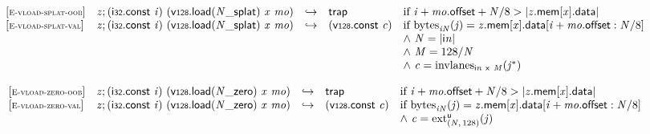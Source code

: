 $$
\begin{array}{@{}l@{}lcl@{}l@{}}
{[\textsc{\scriptsize E{-}vload{-}splat{-}oob}]} \quad & {\mathit{z}} ; (\mathsf{i{\scriptstyle32}}.\mathsf{const}~{\mathit{i}})~({\mathsf{v{\scriptstyle128}.load}}{({{{\mathit{N}}}{\mathsf{\_}}}{\mathsf{splat}})}~{\mathit{x}}~{\mathit{mo}}) &\hookrightarrow& \mathsf{trap} &\quad
  \mbox{if}~{\mathit{i}} + {\mathit{mo}}.\mathsf{offset} + {\mathit{N}} / 8 > {|{{\mathit{z}}.\mathsf{mem}}{{}[{\mathit{x}}]}.\mathsf{data}|} \\
{[\textsc{\scriptsize E{-}vload{-}splat{-}val}]} \quad & {\mathit{z}} ; (\mathsf{i{\scriptstyle32}}.\mathsf{const}~{\mathit{i}})~({\mathsf{v{\scriptstyle128}.load}}{({{{\mathit{N}}}{\mathsf{\_}}}{\mathsf{splat}})}~{\mathit{x}}~{\mathit{mo}}) &\hookrightarrow& (\mathsf{v{\scriptstyle128}}.\mathsf{const}~{\mathit{c}}) &\quad
  \mbox{if}~{{\mathrm{bytes}}}_{{{\mathit{i}}}{{\mathit{N}}}}({\mathit{j}}) = {{\mathit{z}}.\mathsf{mem}}{{}[{\mathit{x}}]}.\mathsf{data}{}[{\mathit{i}} + {\mathit{mo}}.\mathsf{offset} : {\mathit{N}} / 8] \\
 &&&&\quad {\land}~{\mathit{N}} = {|{\mathsf{i}}{{\mathit{n}}}|} \\
 &&&&\quad {\land}~{\mathit{M}} = 128 / {\mathit{N}} \\
 &&&&\quad {\land}~{\mathit{c}} = {{\mathrm{invlanes}}}_{{\mathsf{i}}{{\mathit{n}}}~\mathsf{x}~{\mathit{M}}}({{\mathit{j}}^\ast}) \\
\end{array}
$$

\vspace{1ex}

$$
\begin{array}{@{}l@{}lcl@{}l@{}}
{[\textsc{\scriptsize E{-}vload{-}zero{-}oob}]} \quad & {\mathit{z}} ; (\mathsf{i{\scriptstyle32}}.\mathsf{const}~{\mathit{i}})~({\mathsf{v{\scriptstyle128}.load}}{({{{\mathit{N}}}{\mathsf{\_}}}{\mathsf{zero}})}~{\mathit{x}}~{\mathit{mo}}) &\hookrightarrow& \mathsf{trap} &\quad
  \mbox{if}~{\mathit{i}} + {\mathit{mo}}.\mathsf{offset} + {\mathit{N}} / 8 > {|{{\mathit{z}}.\mathsf{mem}}{{}[{\mathit{x}}]}.\mathsf{data}|} \\
{[\textsc{\scriptsize E{-}vload{-}zero{-}val}]} \quad & {\mathit{z}} ; (\mathsf{i{\scriptstyle32}}.\mathsf{const}~{\mathit{i}})~({\mathsf{v{\scriptstyle128}.load}}{({{{\mathit{N}}}{\mathsf{\_}}}{\mathsf{zero}})}~{\mathit{x}}~{\mathit{mo}}) &\hookrightarrow& (\mathsf{v{\scriptstyle128}}.\mathsf{const}~{\mathit{c}}) &\quad
  \mbox{if}~{{\mathrm{bytes}}}_{{{\mathit{i}}}{{\mathit{N}}}}({\mathit{j}}) = {{\mathit{z}}.\mathsf{mem}}{{}[{\mathit{x}}]}.\mathsf{data}{}[{\mathit{i}} + {\mathit{mo}}.\mathsf{offset} : {\mathit{N}} / 8] \\
 &&&&\quad {\land}~{\mathit{c}} = {{{{\mathrm{ext}}}_{({\mathit{N}},\, 128)}^{\mathsf{u}}}}{({\mathit{j}})} \\
\end{array}
$$

